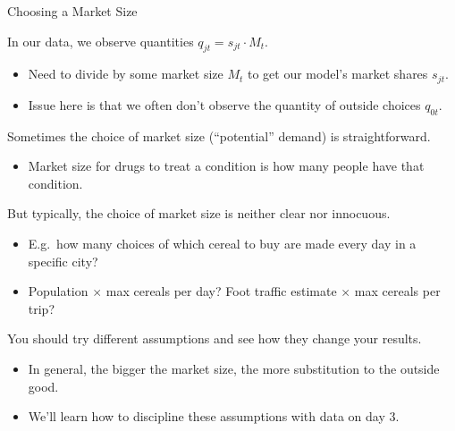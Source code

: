 \documentclass[aspectratio=169,t,11pt,table]{beamer}
\begin{document}
\begin{frame}{Choosing a Market Size}
    \begin{wideitemize}
        \item In our data, we observe quantities $q_{jt} = s_{jt} \cdot M_t$.
        \begin{itemize}
            \item Need to divide by some market size $M_t$ to get our model's market shares $s_{jt}$.
            \item Issue here is that we often don't observe the quantity of outside choices $q_{0t}$.
        \end{itemize}
        \pause
        \item Sometimes the choice of market size (``potential'' demand) is straightforward.
        \begin{itemize}
            \item Market size for drugs to treat a condition is how many people have that condition.
        \end{itemize}
        \pause
        \item But typically, the choice of market size is \alert{neither clear nor innocuous}.
        \begin{itemize}
            \item E.g.\ how many choices of which cereal to buy are made every day in a specific city?
            \item Population $\times$ max cereals per day? Foot traffic estimate $\times$ max cereals per trip?
        \end{itemize}
        \pause
        \item You should try different assumptions and see how they change your results.
        \begin{itemize}
            \item In general, the bigger the market size, the more substitution to the outside good.
            \item We'll learn how to discipline these assumptions with data on day 3.
        \end{itemize}
    \end{wideitemize}
\end{frame}
\end{document}
